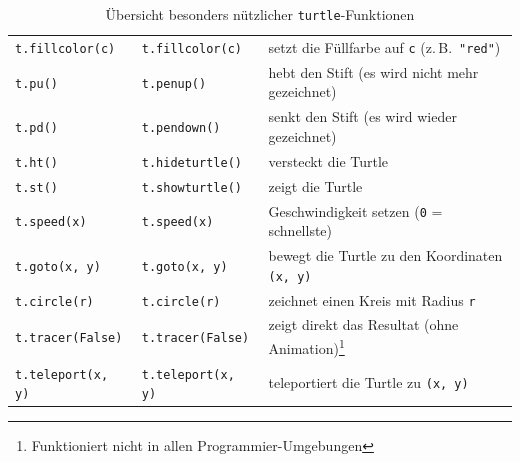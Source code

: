 \begin{myoverview}
\begin{table}[H]
\begin{tabular}{lll}
			\lstinline|t.fillcolor(c)|   & \lstinline|t.fillcolor(c)|   & setzt die Füllfarbe auf \lstinline|c| (z.\,B.\ \lstinline|"red"|)                                    \\
			\lstinline|t.pu()|           & \lstinline|t.penup()|        & hebt den Stift (es wird nicht mehr gezeichnet)                                                          \\
			\lstinline|t.pd()|           & \lstinline|t.pendown()|      & senkt den Stift (es wird wieder gezeichnet)                                                             \\
			\lstinline|t.ht()|           & \lstinline|t.hideturtle()|   & versteckt die Turtle                                                                                    \\
			\lstinline|t.st()|           & \lstinline|t.showturtle()|   & zeigt die Turtle                                                                                        \\
			\lstinline|t.speed(x)|       & \lstinline|t.speed(x)|       & Geschwindigkeit setzen (\lstinline|0| = schnellste)                                                     \\
			\lstinline|t.goto(x, y)|     & \lstinline|t.goto(x, y)|     & bewegt die Turtle zu den Koordinaten \lstinline|(x, y)|                                                 \\
			\lstinline|t.circle(r)|      & \lstinline|t.circle(r)|      & zeichnet einen Kreis mit Radius \lstinline|r|                                                           \\
			\lstinline|t.tracer(False)|  & \lstinline|t.tracer(False)|  & zeigt direkt das Resultat (ohne Animation)\footnote{Funktioniert nicht in allen Programmier-Umgebungen} \\
			\lstinline|t.teleport(x, y)| & \lstinline|t.teleport(x, y)| & teleportiert die Turtle zu \lstinline|(x, y)|                                                           \\
			\midrule
		\end{tabular}
		\caption{Übersicht besonders nützlicher \texttt{turtle}-Funktionen}
	\end{table}
\end{myoverview}



